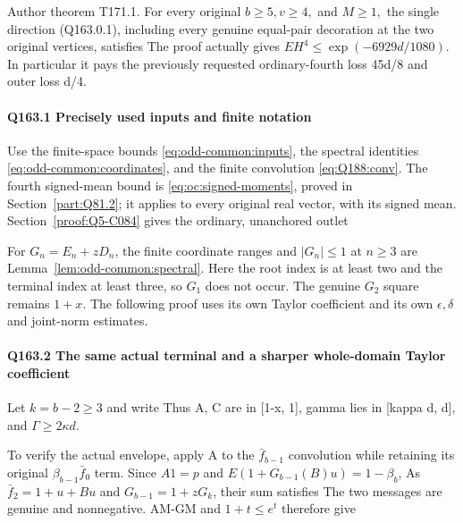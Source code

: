 Author theorem T171.1. For every original \(b\ge 5,\allowbreak  v\ge 4,\allowbreak \) and \(M\ge 1,\allowbreak \) the single
direction (Q163.0.1), including every genuine equal-pair decoration at the two
original vertices, satisfies
The proof actually gives \(EH^4\le \exp(-6929d/1080).\) In particular it pays the
previously requested ordinary-fourth loss 45d/8 and outer loss d/4.

\paragraph{Q163.1 Precisely used inputs and finite notation}

Use the finite-space bounds \eqref{eq:odd-common:inputs}, the spectral
identities \eqref{eq:odd-common:coordinates}, and the finite convolution
\eqref{eq:Q188:conv}. The fourth signed-mean bound is
\eqref{eq:oc:signed-moments}, proved in Section~\ref{part:Q81.2};
it applies to every original real vector, with its signed mean.
Section~\ref{proof:Q5-C084} gives the ordinary, unanchored outlet

For \(G_n=E_n+zD_n\), the finite coordinate ranges and
\(|G_n|\le1\) at \(n\ge3\) are
Lemma~\ref{lem:odd-common:spectral}. Here the root index is at least
two and the terminal index at least three, so \(G_1\) does not occur.
The genuine \(G_2\) square remains \(1+x\).
The following proof uses its own Taylor coefficient and its own
\(\epsilon,\delta\) and joint-norm estimates.

\paragraph{Q163.2 The same actual terminal and a sharper whole-domain Taylor coefficient}\label{part:Q163.2}

Let \(k=b-2\ge 3\) and write
Thus A, C are in [1-x, 1], gamma lies in [kappa d, d], and
\(\Gamma\ge2\kappa d\).

To verify the actual envelope, apply A to the \(\bar f_{b-1}\) convolution while
retaining its original \(\beta_{b-1} \bar f_0\) term. Since \(A1=p\) and
\(E(1+G_{b-1}(B)u)=1-\beta_b\),
As \(\bar f_2=1+u+Bu\) and \(G_{b-1}=1+zG_k\), their sum satisfies
The two messages are genuine and nonnegative. AM-GM and \(1+t\le e^t\) therefore
give

